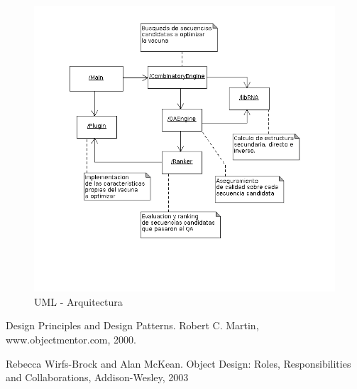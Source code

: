 \documentclass[a4paper,10pt]{article}
\begin{document}
  \begin{figure}
  \centering
  \includegraphics[scale=0.5]{architecture.png}  
  \caption{UML - Arquitectura}
  \label{uml:architecture}
  \end{figure}




\begin{thebibliography}{9}  
  Design Principles and Design Patterns. Robert C. Martin,
www.objectmentor.com, 2000.
  
  Rebecca Wirfs-Brock and Alan McKean. Object Design: Roles, Responsibilities
and Collaborations, Addison-Wesley, 2003  

  
\end{thebibliography}
\end{document}
